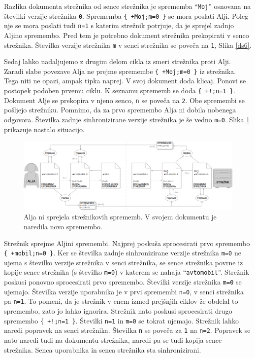 \documentclass[a4paper, 12pt, twoside]{book}
\begin{document}
Razlika dokumenta strežnika od sence strežnika je sprememba “{\tt Moj}” osnovana na številki verzije strežnika {\tt 0}. Sprememba {\tt \{ +Moj;m=0 \}} se mora poslati Alji. Poleg nje se mora poslati tudi {\tt n=1} s katerim strežnik potrjuje, da je sprejel zadnjo Aljino spremembo. Pred tem je potrebno dokument strežnika prekopirati v senco strežnika. Številka verzije strežnika {\tt m} v senci strežnika se poveča na {\tt 1}, Slika \ref{ds6}.

Sedaj lahko nadaljujemo z drugim delom cikla iz smeri strežnika proti Alji. Zaradi slabe povezave Alja ne prejme spremembe {\tt \{ +Moj;m=0 \}} iz strežnika. Tega niti ne opazi, ampak tipka naprej. V svoj dokument doda klicaj. Ponovi se postopek podoben prvemu ciklu. K seznamu sprememb se doda {\tt \{ +!;n=1 \}}. Dokument Alje se prekopira v njeno senco, {\tt n} se poveča na {\tt 2}. Obe spremembi se pošljejo strežniku. Pomnimo, da za prvo spremembo Alja ni dobila nobenega odgovora. Številka zadnje sinhronizirane verzije strežnika je še vedno {\tt m=0}. Slika \ref{ds7} prikazuje nastalo situacijo.

\begin{figure}[placement h]
\begin{center}
\includegraphics[width=16cm]{ds7.png}
\end{center}
\caption{Alja ni sprejela strežnikovih sprememb. V svojem dokumentu je naredila novo spremembo.}
\label{ds7}
\end{figure}

Strežnik sprejme Aljini spremembi. Najprej poskuša sprocesirati prvo spremembo {\tt \{ +mobil;n=0 \}}. Ker se številka zadnje sinhronizirane verzije strežnika {\tt m=0} ne ujema s številko verzije strežnika v senci strežnika, se sence strežnika povrne iz kopije sence strežnika (s številko {\tt m=0}) v katerem se nahaja “{\tt avtomobil}”. Strežnik poskusi ponovno sprocesirati prvo spremembo. Številki verzije strežnika {\tt m=0} se ujemajo. Številka verzije uporabnika je v prvi spremembi {\tt n=0}, v senci strežnika pa {\tt n=1}. To pomeni, da je strežnik v enem izmed prejšnjih ciklov že obdelal to spremembo, zato jo lahko ignorira. Strežnik nato poskusi sprocesirati drugo spremembo {\tt \{ +!;n=1 \}}. Številki {\tt n=1} in {\tt m=0} se tokrat ujemajo. Strežnik lahko naredi popravek na senci strežnika. Številka {\tt n} se poveča za {\tt 1} na {\tt n=2}. Popravek se nato naredi tudi na dokumentu strežnika, naredi pa se tudi kopija sence strežnika. Senca uporabnika in senca strežnika sta sinhronizirani.
\end{document}
